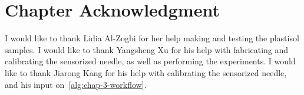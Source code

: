 \section{Chapter Acknowledgment}
\label{sec:chap-3-ack}
I would like to thank Lidia Al-Zogbi for her help making and testing the plastisol samples. I would like to thank Yangsheng Xu for his help with fabricating and calibrating the sensorized needle, as well as performing the experiments. I would like to thank Jiarong Kang for his help with calibrating the sensorized needle, and his input on~\cref{alg:chap-3-workflow}.

